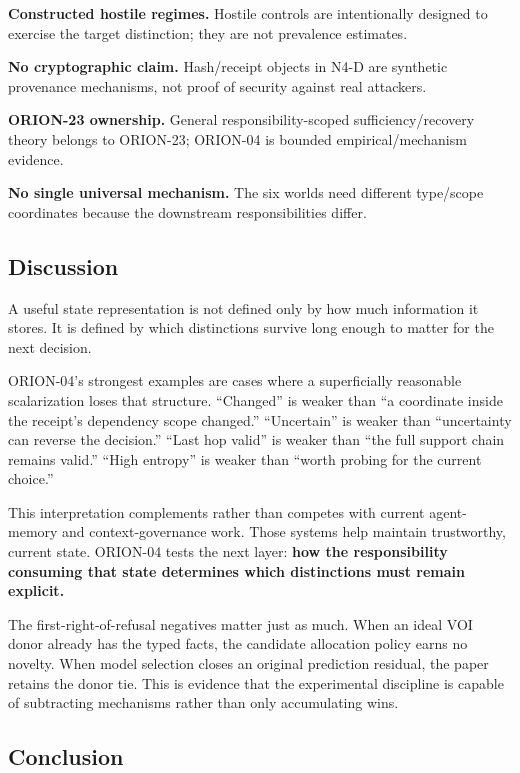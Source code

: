 \documentclass[10pt]{article}
\begin{document}
\textbf{Constructed hostile regimes.} Hostile controls are intentionally
designed to exercise the target distinction; they are not prevalence
estimates.

\textbf{No cryptographic claim.} Hash/receipt objects in N4-D are
synthetic provenance mechanisms, not proof of security against real
attackers.

\textbf{ORION-23 ownership.} General responsibility-scoped
sufficiency/recovery theory belongs to ORION-23; ORION-04 is bounded
empirical/mechanism evidence.

\textbf{No single universal mechanism.} The six worlds need different
type/scope coordinates because the downstream responsibilities differ.

\hypertarget{discussion}{%
\subsection{Discussion}\label{discussion}}

A useful state representation is not defined only by how much
information it stores. It is defined by which distinctions survive long
enough to matter for the next decision.

ORION-04's strongest examples are cases where a superficially reasonable
scalarization loses that structure. ``Changed'' is weaker than ``a
coordinate inside the receipt's dependency scope changed.''
``Uncertain'' is weaker than ``uncertainty can reverse the decision.''
``Last hop valid'' is weaker than ``the full support chain remains
valid.'' ``High entropy'' is weaker than ``worth probing for the current
choice.''

This interpretation complements rather than competes with current
agent-memory and context-governance work. Those systems help maintain
trustworthy, current state. ORION-04 tests the next layer: \textbf{how
the responsibility consuming that state determines which distinctions
must remain explicit.}

The first-right-of-refusal negatives matter just as much. When an ideal
VOI donor already has the typed facts, the candidate allocation policy
earns no novelty. When model selection closes an original prediction
residual, the paper retains the donor tie. This is evidence that the
experimental discipline is capable of subtracting mechanisms rather than
only accumulating wins.

\hypertarget{conclusion}{%
\subsection{Conclusion}\label{conclusion}}
\end{document}
